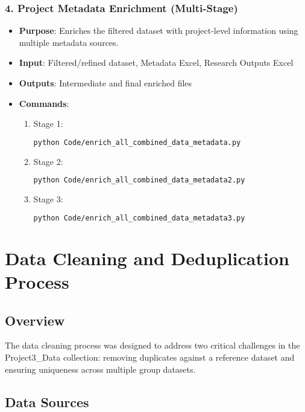 \documentclass[12pt]{article}
\begin{document}
\subsubsection{4. Project Metadata Enrichment (Multi-Stage)}
\begin{itemize}
    \item \textbf{Purpose}: Enriches the filtered dataset with project-level information using multiple metadata sources.
    \item \textbf{Input}: Filtered/refined dataset, Metadata Excel, Research Outputs Excel
    \item \textbf{Outputs}: Intermediate and final enriched files
    \item \textbf{Commands}:
    \begin{enumerate}
        \item Stage 1:
        \begin{lstlisting}[language=bash]
        python Code/enrich_all_combined_data_metadata.py
        \end{lstlisting}
        \item Stage 2:
        \begin{lstlisting}[language=bash]
        python Code/enrich_all_combined_data_metadata2.py
        \end{lstlisting}
        \item Stage 3:
        \begin{lstlisting}[language=bash]
        python Code/enrich_all_combined_data_metadata3.py
        \end{lstlisting}
    \end{enumerate}
\end{itemize}

\section{Data Cleaning and Deduplication Process}

\subsection{Overview}
The data cleaning process was designed to address two critical challenges in the Project3\_Data collection: removing duplicates against a reference dataset and ensuring uniqueness across multiple group datasets.

\subsection{Data Sources}
\end{document}
